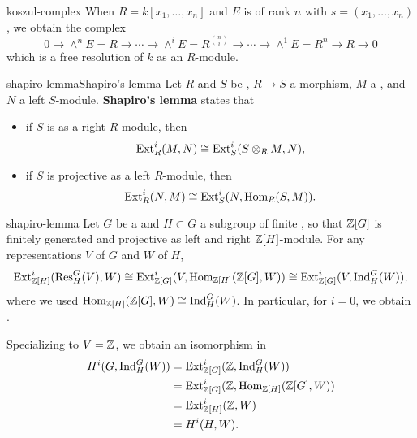 \begin{example}{koszul-complex}
    When $R = k[x_1, \ldots, x_n]$ and $E$ is of rank $n$ with $s = (x_1, \ldots, x_n)$, we obtain the complex 
    \[ 0 \to \wedge^n E = R \to \cdots \to \wedge^i E = R^{\binom{n}{i}} \to \cdots \to \wedge^1 E = R^n \to R \to 0 \]
    which is a free resolution of $k$ as an $R$-module.
\end{example}

\begin{topic}{shapiro-lemma}{Shapiro's lemma}
    Let $R$ and $S$ be , $R \to S$ a morphism, $M$ a , and $N$ a left $S$-module. \textbf{Shapiro's lemma} states that
    \begin{itemize}
        \item if $S$ is  as a right $R$-module, then
        \[ \operatorname{Ext}_R^i(M, N) \cong \operatorname{Ext}_S^i(S \otimes_R M, N) , \]
        \item if $S$ is projective as a left $R$-module, then
        \[ \operatorname{Ext}_R^i(N, M) \cong \operatorname{Ext}_S^i(N, \operatorname{Hom}_R(S, M)) . \]
    \end{itemize}
\end{topic}

\begin{example}{shapiro-lemma}
    Let $G$ be a  and $H \subset G$ a subgroup of finite , so that $\mathbb{Z}[G]$ is finitely generated and projective as left and right $\mathbb{Z}[H]$-module. 
    For any representations $V$ of $G$ and $W$ of $H$,
    \[ \operatorname{Ext}_{\mathbb{Z}[H]}^i(\operatorname{Res}_H^G(V), W) \cong \operatorname{Ext}_{\mathbb{Z}[G]}^i(V, \operatorname{Hom}_{\mathbb{Z}[H]}(\mathbb{Z}[G], W)) \cong \operatorname{Ext}_{\mathbb{Z}[G]}^i(V, \operatorname{Ind}_H^G(W)) , \]
    where we used $\operatorname{Hom}_{\mathbb{Z}[H]}(\mathbb{Z}[G], W) \cong \operatorname{Ind}_H^G(W)$. In particular, for $i = 0$, we obtain .
    
    Specializing to $V = \mathbb{Z}$, we obtain an isomorphism in 
    \[ \begin{aligned}
        H^i(G, \operatorname{Ind}_H^G(W))
            &= \operatorname{Ext}_{\mathbb{Z}[G]}^i(\mathbb{Z}, \operatorname{Ind}_H^G(W)) \\
            &= \operatorname{Ext}_{\mathbb{Z}[G]}^i(\mathbb{Z}, \operatorname{Hom}_{\mathbb{Z}[H]}(\mathbb{Z}[G], W)) \\
            &= \operatorname{Ext}_{\mathbb{Z}[H]}^i(\mathbb{Z}, W) \\
            &= H^i(H, W) .
    \end{aligned} \]
\end{example}


